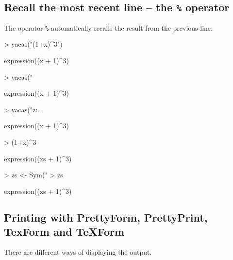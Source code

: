 \documentclass[]{article}
\begin{document}
\subsection{Recall the most recent line -- the \texttt{\%} operator}

The operator \texttt{\%} automatically recalls the result from the
previous line. 
\begin{Schunk}
\begin{Sinput}
> yacas("(1+x)^3")
\end{Sinput}
\begin{Soutput}
expression((x + 1)^3)
\end{Soutput}
\begin{Sinput}
> yacas("%")
\end{Sinput}
\begin{Soutput}
expression((x + 1)^3)
\end{Soutput}
\begin{Sinput}
> yacas("z:= %")
\end{Sinput}
\begin{Soutput}
expression((x + 1)^3)
\end{Soutput}
\end{Schunk}

\begin{Schunk}
\begin{Sinput}
> (1+x)^3
\end{Sinput}
\begin{Soutput}
expression((xs + 1)^3)
\end{Soutput}
\begin{Sinput}
> zs <- Sym("%")
> zs
\end{Sinput}
\begin{Soutput}
expression((xs + 1)^3)
\end{Soutput}
\end{Schunk}



\subsection{Printing with PrettyForm, PrettyPrint, TexForm and  TeXForm} 
\label{sec:printing}

There are different ways of displaying the output. 
\end{document}
